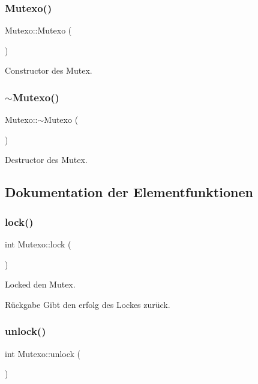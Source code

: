 \subsubsection{\texorpdfstring{Mutexo()}{Mutexo()}}
{\footnotesize\ttfamily Mutexo\+::\+Mutexo (\begin{DoxyParamCaption}{ }\end{DoxyParamCaption})}

Constructor des Mutex. \hypertarget{class_mutexo_af8942ad328e7c91931f63e6a243081d1}{}\label{class_mutexo_af8942ad328e7c91931f63e6a243081d1} 
\subsubsection{\texorpdfstring{$\sim$\+Mutexo()}{~Mutexo()}}
{\footnotesize\ttfamily Mutexo\+::$\sim$\+Mutexo (\begin{DoxyParamCaption}{ }\end{DoxyParamCaption})\hspace{0.3cm}{\ttfamily [virtual]}}

Destructor des Mutex. 

\subsection{Dokumentation der Elementfunktionen}
\hypertarget{class_mutexo_a22aac64070af68adc9acc1fef3d3f4aa}{}\label{class_mutexo_a22aac64070af68adc9acc1fef3d3f4aa} 
\subsubsection{\texorpdfstring{lock()}{lock()}}
{\footnotesize\ttfamily int Mutexo\+::lock (\begin{DoxyParamCaption}{ }\end{DoxyParamCaption})}

Locked den Mutex.

\begin{DoxyReturn}{Rückgabe}
Gibt den erfolg des Lockes zurück. 
\end{DoxyReturn}
\hypertarget{class_mutexo_a9f51083616ed99edc2add313f840016c}{}\label{class_mutexo_a9f51083616ed99edc2add313f840016c} 
\subsubsection{\texorpdfstring{unlock()}{unlock()}}
{\footnotesize\ttfamily int Mutexo\+::unlock (\begin{DoxyParamCaption}{ }\end{DoxyParamCaption})}

